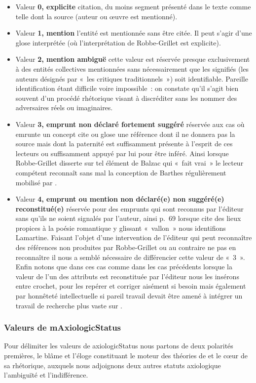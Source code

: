 \documentclass[12pt, a4paper]{article}
\begin{document}
\begin{itemize}
    \item Valeur \textbf{0, explicite} citation, du moins segment présenté dans le texte comme telle dont la source (auteur ou œuvre est mentionné).
    \item Valeur \textbf{1, mention} l'entité est mentionnée sans être citée. Il peut s'agir d'une glose interprétée (où l'interprétation de Robbe-Grillet est explicite).
    \item Valeur \textbf{2, mention ambiguë} cette valeur est réservée presque exclusivement à des entités collectives mentionnées sans nécessairement que les signifiés (les auteurs désignés par «~les critiques traditionnels~») soit identifiable. Pareille identification étant difficile voire impossible~: on constate qu'il s'agit bien souvent d'un procédé rhétorique visant à discréditer sans les nommer des adversaires réels ou imaginaires.
    \item Valeur \textbf{3, emprunt non déclaré fortement suggéré} réservée aux cas où \robbe{} emrunte un concept cite ou glose une référence dont il ne donnera pas la source mais dont la paternité est suffisamment présente à l'esprit de ces lecteurs ou suffisamment appuyé par lui pour être inféré. Ainsi lorsque Robbe-Grillet disserte sur tel élément de Balzac qui «~fait vrai~» le lecteur compétent reconnaît sans mal la conception de Barthes régulièrement mobilisé par \robbe.
    \item Valeur \textbf{4, emprunt ou mention non déclaré(e) non suggéré(e) reconstitué(e)} réservée pour des emprunts qui sont reconnus par l'éditeur sans qu'ils ne soient signalés par l'auteur, ainsi p.~69 lorsque \robbe{} cite des lieux propices à la poésie romantique y glissant «~vallon~» nous identifions Lamartine. Faisant l'objet d'une intervention de l'éditeur qui peut reconnaître des références non produites par Robbe-Grillet ou au contraire ne pas en reconnaître il nous a semblé nécessaire de différencier cette valeur de «~3~». Enfin notons que dans ces cas comme dans les cas précédents lorsque la valeur de l'un des attributs est reconstituée par l'éditeur nous les insérons entre crochet, pour les repérer et corriger aisément si besoin mais également par honnêteté intellectuelle si pareil travail devait être amené à intégrer un travail de recherche plus vaste sur \punr{}.
\end{itemize}

\subsubsection{Valeurs de mAxiologicStatus}
Pour délimiter les valeurs de axiologicStatus nous partons de deux polarités premières, le blâme et l'éloge constituant le moteur des théories de \robbe{} et le cœur de sa rhétorique, auxquels nous adjoignons deux autres statuts axiologique l'ambiguïté et l'indifférence. 
\end{document}
